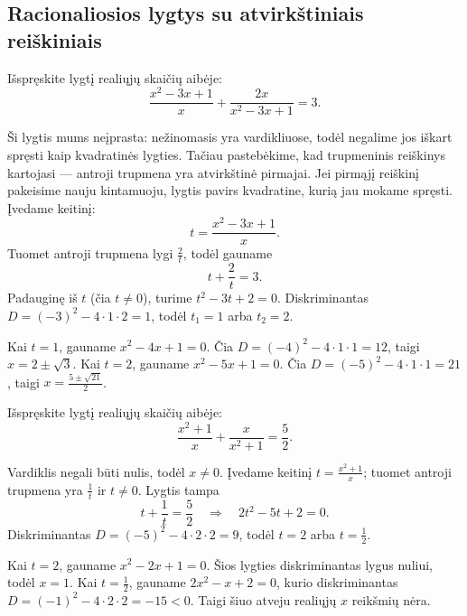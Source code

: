 \documentclass[11pt,a4paper]{scrartcl}
\begin{document}
\subsection{Racionaliosios lygtys su atvirkštiniais reiškiniais}

\begin{example}
Išspręskite lygtį realiųjų skaičių aibėje:
\begin{equation*}
\frac{x^2-3x+1}{x}+\frac{2x}{x^2-3x+1}=3.
\end{equation*}
\end{example}
\begin{solution}
Ši lygtis mums neįprasta: nežinomasis yra vardikliuose, todėl negalime jos iškart spręsti kaip kvadratinės lygties. Tačiau pastebėkime, kad trupmeninis reiškinys kartojasi — antroji trupmena yra atvirkštinė pirmajai. Jei pirmąjį reiškinį pakeisime nauju kintamuoju, lygtis pavirs kvadratine, kurią jau mokame spręsti. Įvedame keitinį:
\begin{equation*}
t=\frac{x^2-3x+1}{x}.
\end{equation*}
Tuomet antroji trupmena lygi \(\frac{2}{t}\), todėl gauname
\begin{equation*}
t+\frac{2}{t}=3.
\end{equation*}
Padauginę iš \(t\) (čia \(t\ne0\)), turime \(t^2-3t+2=0\). Diskriminantas \(D=(-3)^2-4\cdot1\cdot2=1\), todėl \(t_1=1\) arba \(t_2=2\).

Kai \(t=1\), gauname \(x^2-4x+1=0\). Čia \(D=(-4)^2-4\cdot1\cdot1=12\), taigi \(x=2\pm\sqrt3\). Kai \(t=2\), gauname \(x^2-5x+1=0\). Čia \(D=(-5)^2-4\cdot1\cdot1=21\), taigi \(x=\frac{5\pm\sqrt{21}}{2}\).
\end{solution}

\begin{example}
Išspręskite lygtį realiųjų skaičių aibėje:
\begin{equation*}
\frac{x^2+1}{x}+\frac{x}{x^2+1}=\frac52.
\end{equation*}
\end{example}
\begin{solution}
Vardiklis negali būti nulis, todėl \(x\ne0\). Įvedame keitinį \(t=\frac{x^2+1}{x}\); tuomet antroji trupmena yra \(\frac1t\) ir \(t\ne0\). Lygtis tampa
\begin{equation*}
t+\frac1t=\frac52\quad\Longrightarrow\quad 2t^2-5t+2=0.
\end{equation*}
Diskriminantas \(D=(-5)^2-4\cdot2\cdot2=9\), todėl \(t=2\) arba \(t=\frac12\).

Kai \(t=2\), gauname \(x^2-2x+1=0\). Šios lygties diskriminantas lygus nuliui, todėl \(x=1\). Kai \(t=\frac12\), gauname \(2x^2-x+2=0\), kurio diskriminantas \(D=(-1)^2-4\cdot2\cdot2=-15<0\). Taigi šiuo atveju realiųjų \(x\) reikšmių nėra.
\end{solution}
\end{document}
